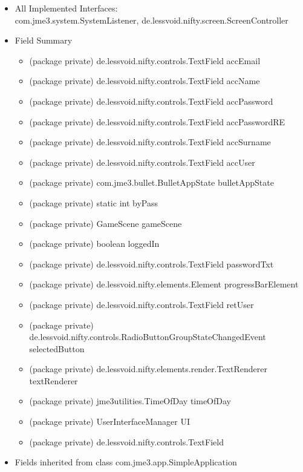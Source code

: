 \documentclass[letterpaper]{article}
\begin{document}
						\begin{itemize}
							\item 	All Implemented Interfaces: \\
									com.jme3.system.SystemListener, de.lessvoid.nifty.screen.ScreenController
							\item	Field Summary
									\begin{itemize}
										\item	(package private) de.lessvoid.nifty.controls.TextField	accEmail 
										\item	(package private) de.lessvoid.nifty.controls.TextField	accName 
										\item	(package private) de.lessvoid.nifty.controls.TextField	accPassword 
										\item	(package private) de.lessvoid.nifty.controls.TextField	accPasswordRE 
										\item	(package private) de.lessvoid.nifty.controls.TextField	accSurname 
										\item	(package private) de.lessvoid.nifty.controls.TextField	accUser 
										\item	(package private) com.jme3.bullet.BulletAppState	bulletAppState 
										\item	(package private) static int	byPass 
										\item	(package private) GameScene	gameScene 
										\item	(package private) boolean	loggedIn 
										\item	(package private) de.lessvoid.nifty.controls.TextField	passwordTxt 
										\item	(package private) de.lessvoid.nifty.elements.Element	progressBarElement 
										\item	(package private) de.lessvoid.nifty.controls.TextField	retUser 
										\item	(package private) de.lessvoid.nifty.controls.RadioButtonGroupStateChangedEvent	selectedButton 
										\item	(package private) de.lessvoid.nifty.elements.render.TextRenderer	textRenderer 
										\item	(package private) jme3utilities.TimeOfDay	timeOfDay 
										\item	(package private) UserInterfaceManager	UI 
										\item	(package private) de.lessvoid.nifty.controls.TextField
									\end{itemize} 
							\item	Fields inherited from class com.jme3.app.SimpleApplication \\

\end{itemize}
\end{document}
